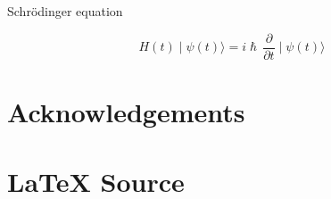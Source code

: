 \documentclass[11pt, oneside]{article}
\theoremstyle{definition}
\begin{document}
\bigskip
\noindent
Schrödinger equation

{\normalsize
\begin{equation*}
H(t) \mid \psi(t)\rangle = i \hslash \, \dfrac{\partial}{\partial t} \mid \psi(t) \rangle
\end{equation*}
}



\bigskip
\bigskip
%
%
%
\section*{Acknowledgements}
%
%
\section*{\LaTeX \hspace{0.10 mm} Source}
%
%
%


%
%
\end{document}
